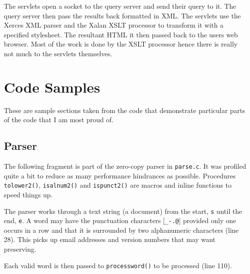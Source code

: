 The servlets open a socket to the query server and send their query to it.  The query server then pass the results back formatted in XML.  The servlets use the Xerces XML parser and the Xalan XSLT processor to transform it with a specified stylesheet.  The resultant HTML it then passed back to the users web browser.  Most of the work is done by the XSLT processor hence there is really not much to the servlets themselves.


\section{Code Samples}
These are sample sections taken from the code that demonstrate particular parts of the code that I am most proud of.

\subsection{Parser}
The following fragment is part of the zero-copy parser in \texttt{parse.c}.  It was profiled quite a bit to reduce as many performance hindrances as possible.  Procedures \texttt{tolower2()}, \texttt{isalnum2()} and \texttt{ispunct2()} are macros and inline functions to speed things up.

The parser works through a text string (a document) from the start, \texttt{s} until the end, \texttt{e}.  A word may have the punctuation characters [\texttt{\_-.@}] provided only one occurs in a row and that it is surrounded by two alphanumeric characters (line 28).  This picks up email addresses and version numbers that may want preserving.

Each valid word is then passed to \texttt{processword()} to be processed (line 110).

